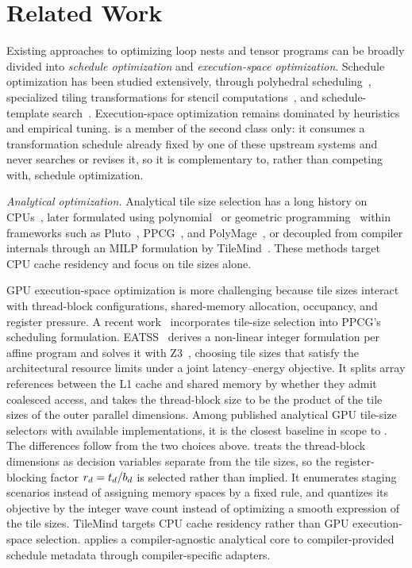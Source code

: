 \section{Related Work}
\label{sec:related}

Existing approaches to optimizing loop nests and tensor programs can be broadly divided into \emph{schedule optimization} and \emph{execution-space optimization}. Schedule optimization has been studied extensively, through polyhedral scheduling~\cite{ppcg,polly,tc,polygeist,akg}, specialized tiling transformations for stencil computations~\cite{splitover,hybridtile,diamond}, and schedule-template search~\cite{halide,tvm}. Execution-space optimization remains dominated by heuristics and empirical tuning. \name is a member of the second class only: it consumes a transformation schedule already fixed by one of these upstream systems and never searches or revises it, so it is complementary to, rather than competing with, schedule optimization.

\par\noindent\hspace*{\parindent}\textit{Analytical optimization.} Analytical tile size selection has a long history on CPUs~\cite{mckinley-tss,lam-tss,pingali-tss,tss-revisited}, later formulated using polynomial~\cite{pluto-tss} or geometric programming~\cite{rajopadhye-gp,rajopadhye-igp} within frameworks such as Pluto~\cite{pluto}, PPCG~\cite{ppcg}, and PolyMage~\cite{polymage}, or decoupled from compiler internals through an MILP formulation by TileMind~\cite{tilemind}. These methods target CPU cache residency and focus on tile sizes alone.

GPU execution-space optimization is more challenging because tile sizes interact with thread-block configurations, shared-memory allocation, occupancy, and register pressure. A recent work~\cite{ppcg-tss} incorporates tile-size selection into PPCG's scheduling formulation. EATSS~\cite{eatss} derives a non-linear integer formulation per affine program and solves it with Z3~\cite{z3}, choosing tile sizes that satisfy the architectural resource limits under a joint latency--energy objective. It splits array references between the L1 cache and shared memory by whether they admit coalesced access, and takes the thread-block size to be the product of the tile sizes of the outer parallel dimensions. Among published analytical GPU tile-size selectors with available implementations, it is the closest baseline in scope to \name. The differences follow from the two choices above. \name treats the thread-block dimensions as decision variables separate from the tile sizes, so the register-blocking factor \(r_d=t_d/b_d\) is selected rather than implied. It enumerates staging scenarios instead of assigning memory spaces by a fixed rule, and quantizes its objective by the integer wave count instead of optimizing a smooth expression of the tile sizes. TileMind targets CPU cache residency rather than GPU execution-space selection. \name applies a compiler-agnostic analytical core to compiler-provided schedule metadata through compiler-specific adapters.

